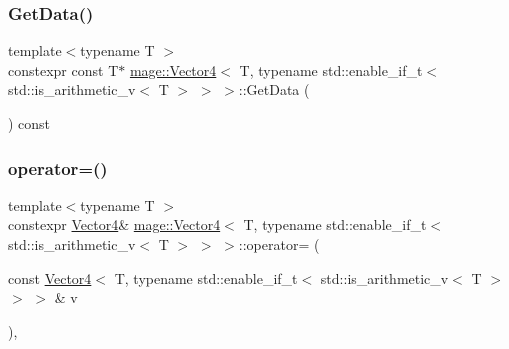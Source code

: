 \subsubsection{\texorpdfstring{Get\+Data()}{GetData()}\hspace{0.1cm}{\footnotesize\ttfamily [2/2]}}
{\footnotesize\ttfamily template$<$typename T $>$ \\
constexpr const T$\ast$ \hyperlink{structmage_1_1_vector4}{mage\+::\+Vector4}$<$ T, typename std\+::enable\+\_\+if\+\_\+t$<$ std\+::is\+\_\+arithmetic\+\_\+v$<$ T $>$ $>$ $>$\+::Get\+Data (\begin{DoxyParamCaption}{ }\end{DoxyParamCaption}) const\hspace{0.3cm}{\ttfamily [noexcept]}}

\hypertarget{structmage_1_1_vector4_3_01_t_00_01typename_01std_1_1enable__if__t_3_01std_1_1is__arithmetic__v_3_01_t_01_4_01_4_01_4_afd3b3ce2f9068d7f669f03b85821d43a}{}\label{structmage_1_1_vector4_3_01_t_00_01typename_01std_1_1enable__if__t_3_01std_1_1is__arithmetic__v_3_01_t_01_4_01_4_01_4_afd3b3ce2f9068d7f669f03b85821d43a} 
\subsubsection{\texorpdfstring{operator=()}{operator=()}\hspace{0.1cm}{\footnotesize\ttfamily [1/2]}}
{\footnotesize\ttfamily template$<$typename T $>$ \\
constexpr \hyperlink{structmage_1_1_vector4}{Vector4}\& \hyperlink{structmage_1_1_vector4}{mage\+::\+Vector4}$<$ T, typename std\+::enable\+\_\+if\+\_\+t$<$ std\+::is\+\_\+arithmetic\+\_\+v$<$ T $>$ $>$ $>$\+::operator= (\begin{DoxyParamCaption}\item[{const \hyperlink{structmage_1_1_vector4}{Vector4}$<$ T, typename std\+::enable\+\_\+if\+\_\+t$<$ std\+::is\+\_\+arithmetic\+\_\+v$<$ T $>$ $>$ $>$ \&}]{v }\end{DoxyParamCaption})\hspace{0.3cm}{\ttfamily [default]}, {\ttfamily [noexcept]}}

